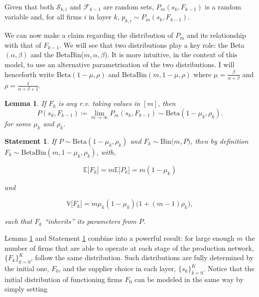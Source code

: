 \documentclass[draft, american, abstract=on]{scrartcl}
\theoremstyle{plain}
\newtheorem{lemma}{Lemma}
\newtheorem{statement}{Statement}
\newcommand{\E}{\mathbb{E}}
\newcommand{\V}{\mathbb{V}}
\newcommand{\Beta}{\text{Beta}}
\newcommand{\Bin}{\text{Bin}}
\begin{document}
Given that both $\mathcal{S}_{k, i}$ and $\mathcal{F}_{k - 1}$ are random sets, $P_m(s_k, F_{k-1})$ is a random variable and, for all firms $i$ in layer $k$, $p_{k, i} \sim P_m(s_k, F_{k-1})$.

We can now make a claim regarding the distribution of $P_m$ and its relationship with that of $F_{k - 1}$. We will see that two distributions play a key role: the Beta$(\alpha, \beta)$ and the BetaBin($m, \alpha, \beta$). It is more intuitive, in the context of this model, to use an alternative parametrisation of the two distributions. I will henceforth write $\Beta(1 - \mu, \rho)$ and $\Beta\Bin(m, 1 - \mu, \rho)$ where $\mu = \frac{\beta}{\alpha + \beta}$ and $\rho = \frac{1}{\alpha + \beta + 1}$.

\begin{lemma} \label{lemma:Ftop}
  If $F_k$ is any r.v. taking values in $[m]$, then \begin{equation*}P(s_k, F_{k - 1}) \coloneqq \lim_{m \rightarrow \infty} P_m(s_k, F_{k - 1}) \sim \Beta(1 - \mu_k, \rho_k).\end{equation*} for some $\mu_k$ and $\rho_k$.
\end{lemma}



\begin{statement} \label{statement:ptoF}
  If $P \sim \Beta(1 - \mu_k, \rho_k)$ and $F_k \sim \Bin\big(m, P \big)$, then by definition $F_k \sim \Beta\Bin(m, 1 - \mu_k, \rho_k)$, with,

  \begin{equation} \label{eq:mean_of_F}
    \E \big[F_k\big] = m \E \big[P_k\big] = m (1 - \mu_k)
  \end{equation}

  and 

  \begin{equation} \label{eq:var_of_F}
    \V \big[F_k\big] = m \mu_k (1 - \mu_k) \big(1 + (m - 1) \rho_k\big),
  \end{equation}

  such that $F_k$ ``inherits'' its parameters from $P$.
\end{statement}


Lemma \ref*{lemma:Ftop} and Statement \ref*{statement:ptoF} combine into a powerful result: for large enough $m$ the number of firms that are able to operate at each stage of the production network, $\{F_k\}^{K}_{k = 0}$, follow the same distribution. Such distributions are fully determined by the initial one, $F_0$, and the supplier choice in each layer, $\{s_k\}^{K}_{k = 0}$. Notice that the initial distribution of functioning firms $F_0$ can be modeled in the same way by simply setting 
\end{document}
